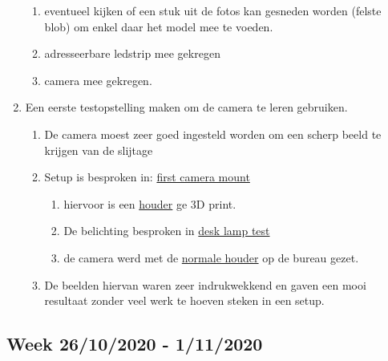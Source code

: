 \documentclass{scrartcl}
\begin{document}
\begin{enumerate}[1]
\begin{enumerate}[a]
	\item eventueel kijken of een stuk uit de fotos kan gesneden worden (felste blob) om enkel daar het model mee te voeden.
	\item adresseerbare ledstrip mee gekregen
	\item camera mee gekregen.
	\end{enumerate}
\item Een eerste testopstelling maken om de camera te leren gebruiken.
	\begin{enumerate}[a]
	\item De camera moest zeer goed ingesteld worden om een scherp beeld te krijgen van de slijtage
	\item Setup is besproken in: \href{../../Camera_setup/Camera_mount/First_Camera_Mount.tex}{first camera mount} 
		\begin{enumerate}[1]
		\item hiervoor is een \href{../../Camera_setup/Tool_Holder/Simple_holder.tex}{houder} ge 3D print.
		\item De belichting besproken in \href{../../Camera_setup/Light/Desk_Lamp_Test.tex}{desk lamp test}
		\item de camera werd met de \href{../../Camera_setup/Camera_mount/First_Camera_Mount.tex}{normale houder} op de bureau gezet. 
		\end{enumerate}
	\item De beelden hiervan waren zeer indrukwekkend en gaven een mooi resultaat zonder veel werk te hoeven steken in een setup.
	\end{enumerate}
\end{enumerate}


\subsection{Week 26/10/2020 - 1/11/2020}
\end{document}
